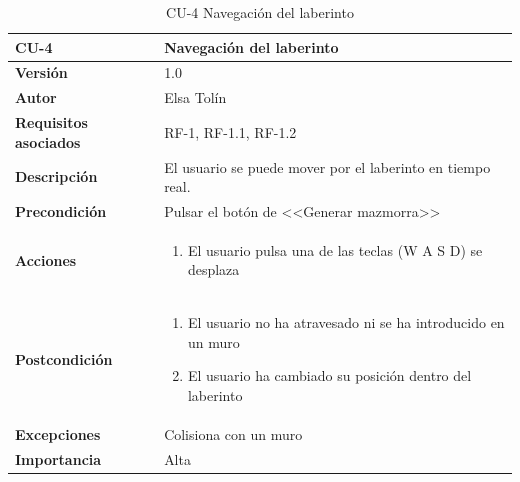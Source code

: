 \begin{table}[p]
	\centering
	\begin{tabularx}{\linewidth}{ p{} p{} }
			\toprule
			\textbf{CU-4}    & \textbf{Navegación del laberinto}\\
			\toprule
			\textbf{Versión}              & 1.0    \\
			\textbf{Autor}                & Elsa Tolín \\
			\textbf{Requisitos asociados} & RF-1, RF-1.1, RF-1.2 \\
			\textbf{Descripción}          & El usuario se puede mover por el laberinto en tiempo real.\\
			\textbf{Precondición}         & Pulsar el botón de <<Generar mazmorra>>\\
			\textbf{Acciones}             &
			\begin{enumerate}
					\def\labelenumi{\arabic{enumi}.}
					\tightlist
					\item El usuario pulsa una de las teclas (W A S D) se desplaza
				\end{enumerate}\\
			\textbf{Postcondición}        & 
            \begin{enumerate}
					\def\labelenumi{\arabic{enumi}.}
					\tightlist
					\item El usuario no ha atravesado ni se ha introducido en un muro
                    \item El usuario ha cambiado su posición dentro del laberinto
				\end{enumerate}\\
			\textbf{Excepciones}          & Colisiona con un muro\\
			\textbf{Importancia}          & Alta\\
			\bottomrule
		\end{tabularx}
	\caption{CU-4 Navegación del laberinto}
\end{table}


